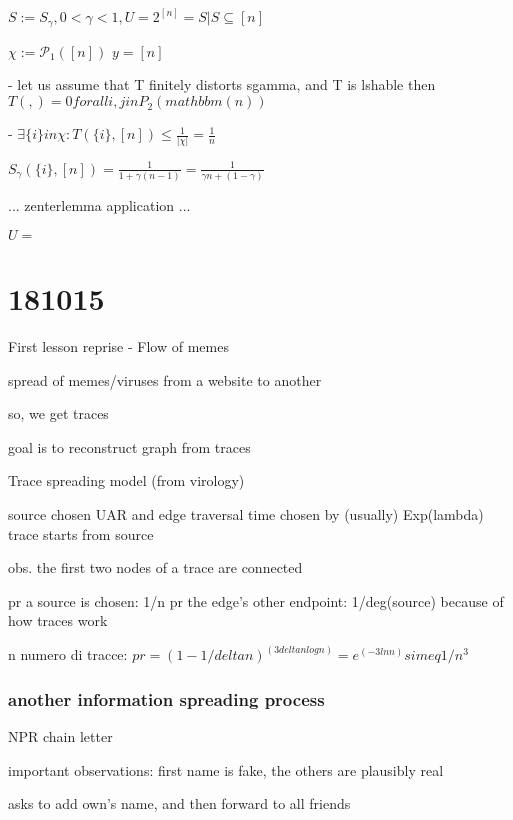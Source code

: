 \documentclass{report}
\begin{document}
	
	
	
	$S:= S_\gamma , 0 < \gamma < 1, U=2^{[n]}={S|S\subseteq [n]}$ %
	
	$\chi := \mathcal{P}_1([n])$
	$y = [n]$
	
	 - let us assume that T finitely distorts sgamma, and T is lshable
	then $T({},{}) = 0 forall {i, j} in P_2(mathbbm(n))$
	
	 - $\exists \{i\} in \chi : T(\{i\}, [n]) \leq \frac{1}{|\chi|} = \frac{1}{n}$
	 
	 $S_\gamma(\{i\}, [n]) = \frac{1}{1 + \gamma(n-1)} = \frac{1}{\gamma n + (1-\gamma)}$
	 
	 ...
	 zenterlemma application
	 ...
	
	
	
	$ U = {}$
	
	
	\chapter{181015}
	
	First lesson reprise - Flow of memes
	
	spread of memes/viruses from a website to another
	
	so, we get traces
	
	goal is to reconstruct graph from traces
	
	Trace spreading model (from virology)
	
	source chosen UAR and edge traversal time chosen by (usually) Exp(lambda)
	trace starts from source
	
	obs. the first two nodes of a trace are connected
	
	pr a source is chosen: 1/n
	pr the edge's other endpoint: 1/deg(source) because of how traces work
	
	n numero di tracce: $pr = (1-1/deltan)^(3deltanlogn) = e^(-3lnn) simeq 1/n^3$
	
	
	\subsection{another information spreading process}
	
	NPR chain letter
	
	important observations: first name is fake, the others are plausibly real
	
	asks to add own's name, and then forward to all friends
	
\end{document}

